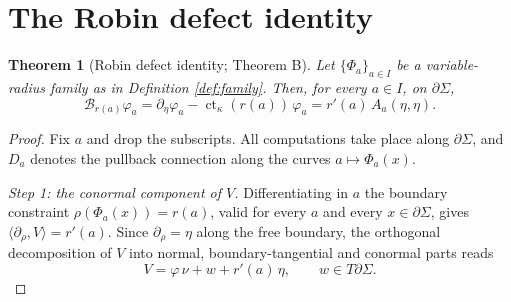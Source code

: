 \documentclass[10pt,a4paper]{amsart}
\newtheorem{theorem}{Theorem}[section]
\newcommand{\ct}{\operatorname{ct}_\kappa}
\begin{document}
\section{The Robin defect identity}\label{sec:identity}

\begin{theorem}[Robin defect identity; Theorem B]\label{thm:defect}
Let $\{\Phi_a\}_{a\in I}$ be a variable-radius family as in Definition \ref{def:family}. Then, for every $a\in I$, on $\partial\Sigma$,
\begin{equation}\label{eq:defect}
\mathcal{B}_{r(a)}\varphi_a=\partial_\eta\varphi_a-\ct(r(a))\,\varphi_a=r'(a)\,A_a(\eta,\eta).
\end{equation}
\end{theorem}

\begin{proof}
Fix $a$ and drop the subscripts. All computations take place along $\partial\Sigma$, and $D_a$ denotes the pullback connection along the curves $a\mapsto\Phi_a(x)$.

\emph{Step 1: the conormal component of $V$.} Differentiating in $a$ the boundary constraint $\rho(\Phi_a(x))=r(a)$, valid for every $a$ and every $x\in\partial\Sigma$, gives $\langle\partial_\rho,V\rangle=r'(a)$. Since $\partial_\rho=\eta$ along the free boundary, the orthogonal decomposition of $V$ into normal, boundary-tangential and conormal parts reads
\begin{equation}\label{eq:decomp}
V=\varphi\,\nu+w+r'(a)\,\eta,\qquad w\in T\partial\Sigma.
\end{equation}


\end{proof}
\end{document}
